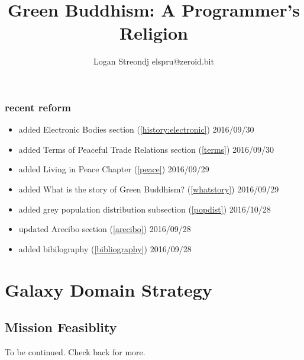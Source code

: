 \documentclass{report}
\title{Green Buddhism: A Programmer's Religion}
\author{Logan Streondj elspru@zeroid.bit}
\begin{document}
\section{recent reform}
\begin{itemize}
  \item added Electronic Bodies section (\ref{history:electronic}) 2016/09/30
  \item added Terms of Peaceful Trade Relations section (\ref{terms}) 2016/09/30
  \item added Living in Peace Chapter (\ref{peace}) 2016/09/29
  \item added What is the story of Green Buddhism? (\ref{whatstory}) 2016/09/29
  \item added grey population distribution subsection (\ref{popdist})
2016/10/28
 \item updated Arecibo section (\ref{arecibo}) 2016/09/28
 \item added bibilography (\ref{bibliography}) 2016/09/28
\end{itemize}

\tableofcontents
 

\part{Galaxy Domain Strategy}









\chapter{Mission Feasiblity}
\label{feasible}

To be continued.
Check back for more.
\end{document}
